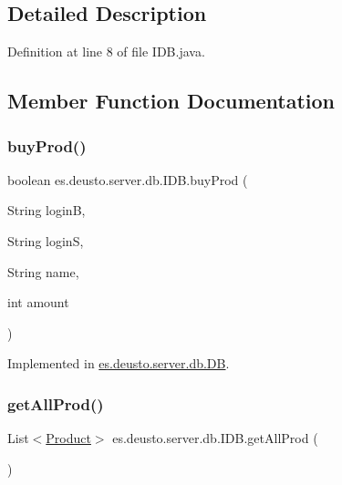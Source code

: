 \subsection{Detailed Description}


Definition at line 8 of file I\+D\+B.\+java.



\subsection{Member Function Documentation}
\mbox{\label{interfacees_1_1deusto_1_1server_1_1db_1_1_i_d_b_a64b43ced1334b833f7ee557badd2c5b7}} 
\subsubsection{\texorpdfstring{buy\+Prod()}{buyProd()}}
{\footnotesize\ttfamily boolean es.\+deusto.\+server.\+db.\+I\+D\+B.\+buy\+Prod (\begin{DoxyParamCaption}\item[{String}]{loginB,  }\item[{String}]{loginS,  }\item[{String}]{name,  }\item[{int}]{amount }\end{DoxyParamCaption})}



Implemented in \hyperlink{classes_1_1deusto_1_1server_1_1db_1_1_d_b_a06ce3aee905784e5ec88a8945452548e}{es.\+deusto.\+server.\+db.\+DB}.

\mbox{\label{interfacees_1_1deusto_1_1server_1_1db_1_1_i_d_b_aba694290fde102c2eed31e505dd257fb}} 
\subsubsection{\texorpdfstring{get\+All\+Prod()}{getAllProd()}}
{\footnotesize\ttfamily List$<$\hyperlink{classes_1_1deusto_1_1server_1_1db_1_1data_1_1_product}{Product}$>$ es.\+deusto.\+server.\+db.\+I\+D\+B.\+get\+All\+Prod (\begin{DoxyParamCaption}{ }\end{DoxyParamCaption})}



